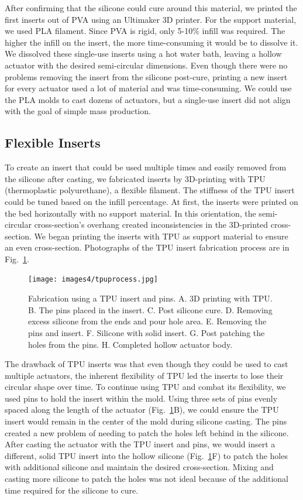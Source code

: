 After confirming that the silicone could cure around this material, we printed the first inserts out of PVA using an Ultimaker 3D printer. For the support material, we used PLA filament. Since PVA is rigid, only 5-10\% infill was required. The higher the infill on the insert, the more time-consuming it would be to dissolve it. We dissolved these single-use inserts using a hot water bath, leaving a hollow actuator with the desired semi-circular dimensions. Even though there were no problems removing the insert from the silicone post-cure, printing a new insert for every actuator used a lot of material and was time-consuming. We could use the PLA molds to cast dozens of actuators, but a single-use insert did not align with the goal of simple mass production.

\subsection{Flexible Inserts}

To create an insert that could be used multiple times and easily removed from the silicone after casting, we fabricated inserts by 3D-printing with TPU (thermoplastic polyurethane), a flexible filament. The stiffness of the TPU insert could be tuned based on the infill percentage. At first, the inserts were printed on the bed horizontally with no support material. In this orientation, the semi-circular cross-section's overhang created inconsistencies in the 3D-printed cross-section. We began printing the inserts with TPU as support material to ensure an even cross-section. Photographs of the TPU insert fabrication process are in Fig.~\ref{fig:tpuprocess}. \\

\begin{figure}[!ht]
    \centering
    \texttt{[image: images4/tpuprocess.jpg]}
    \caption{Fabrication using a TPU insert and pins. A. 3D printing with TPU. B. The pins placed in the insert.  C. Post silicone cure. D. Removing excess silicone from the ends and pour hole area. E. Removing the pins and insert. F. Silicone with solid insert. G. Post patching the holes from the pins. H. Completed hollow actuator body.}
    \label{fig:tpuprocess}
\end{figure}

The drawback of TPU inserts was that even though they could be used to cast multiple actuators, the inherent flexibility of TPU led the inserts to lose their circular shape over time. To continue using TPU and combat its flexibility, we used pins to hold the insert within the mold. Using three sets of pins evenly spaced along the length of the actuator (Fig.~\ref{fig:tpuprocess}B), we could ensure the TPU insert would remain in the center of the mold during silicone casting. The pins created a new problem of needing to patch the holes left behind in the silicone. After casting the actuator with the TPU insert and pins, we would insert a different, solid TPU insert into the hollow silicone (Fig.~\ref{fig:tpuprocess}F) to patch the holes with additional silicone and maintain the desired cross-section. Mixing and casting more silicone to patch the holes was not ideal because of the additional time required for the silicone to cure. 


